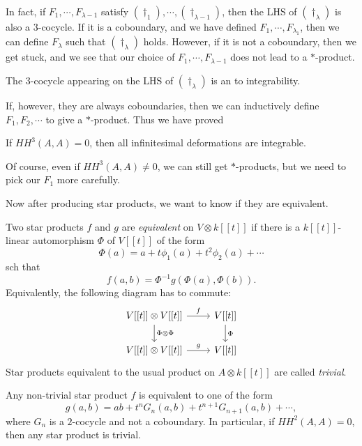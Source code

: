 \documentclass[a4paper]{article}
\newcommand\HH{H\!H}
\begin{document}
In fact, if $F_1, \cdots, F_{\lambda - 1}$ satisfy $(\dagger_1), \cdots, (\dagger_{\lambda - 1})$, then the LHS of $(\dagger_\lambda)$ is also a $3$-cocycle. If it is a coboundary, and we have defined $F_1, \cdots, F_{\lambda_1}$, then we can define $F_\lambda$ such that $(\dagger_\lambda)$ holds. However, if it is not a coboundary, then we get stuck, and we see that our choice of $F_1, \cdots, F_{\lambda - 1}$ does not lead to a $*$-product.

The $3$-cocycle appearing on the LHS of $(\dagger_\lambda)$ is an  to integrability.

If, however, they are always coboundaries, then we can inductively define $F_1, F_2, \cdots$ to give a $*$-product. Thus we have proved
\begin{thm}[Gerstenhaber]
  If $\HH^3(A, A) = 0$, then all infinitesimal deformations are integrable.
\end{thm}
Of course, even if $\HH^3(A, A) \not= 0$, we can still get $*$-products, but we need to pick our $F_1$ more carefully.

Now after producing star products, we want to know if they are equivalent.

\begin{defi}
  Two star products $f$ and $g$ are \emph{equivalent} on $V \otimes k[[t]]$ if there is a $k[[t]]$-linear automorphism $\Phi$ of $V[[t]]$ of the form
  \[
    \Phi(a) = a + t \phi_1(a) + t^2 \phi_2(a) + \cdots
  \]
  sch that
  \[
    f(a, b) = \Phi^{-1} g(\Phi(a), \Phi(b)).
  \]
  Equivalently, the following diagram has to commute:
  \[
    \begin{tikzcd}
      V[[t]] \otimes V[[t]] \ar[r, "f"] \ar[d, "\Phi \otimes \Phi"] & V[[t]] \ar[d, "\Phi"]\\
      V[[t]] \otimes V[[t]] \ar[r, "g"] & V[[t]]
    \end{tikzcd}
  \]
  Star products equivalent to the usual product on $A \otimes k[[t]]$ are called \emph{trivial}.
\end{defi}

\begin{thm}[Gerstenhaber]
  Any non-trivial star product $f$ is equivalent to one of the form
  \[
    g(a, b) = ab + t^n G_n(a, b) + t^{n + 1} G_{n + 1}(a, b) + \cdots,
  \]
  where $G_n$ is a $2$-cocycle and not a coboundary. In particular, if $\HH^2(A, A) = 0$, then any star product is trivial.
\end{thm}
\end{document}
